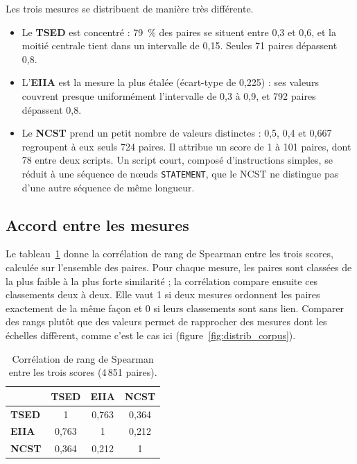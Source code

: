 \documentclass[12pt,a4paper,oneside]{report}
\begin{document}
Les trois mesures se distribuent de manière très différente.
\begin{itemize}
  \item Le \textcolor{tsedcol}{\textbf{TSED}} est concentré : 79~\% des
        paires se situent entre 0,3 et 0,6, et la moitié centrale tient dans
        un intervalle de 0,15. Seules 71 paires dépassent 0,8.
  \item L'\textcolor{eiiacol}{\textbf{EIIA}} est la mesure la plus étalée
        (écart-type de 0,225) : ses valeurs couvrent presque uniformément
        l'intervalle de 0,3 à 0,9, et 792 paires dépassent 0,8.
  \item Le \textcolor{ncstcol}{\textbf{NCST}} prend un petit nombre de valeurs
        distinctes : 0,5, 0,4 et 0,667 regroupent à eux seuls 724 paires. Il attribue un score de 1 à
        101 paires, dont 78 entre deux scripts. Un script court, composé
        d'instructions simples, se réduit à une séquence de nœuds
        \texttt{STATEMENT}, que le NCST ne distingue pas d'une autre séquence
        de même longueur.
\end{itemize}

\subsection{Accord entre les mesures}

Le tableau~\ref{tab:spearman_corpus} donne la corrélation de rang de Spearman
entre les trois scores, calculée sur l'ensemble des paires. Pour chaque
mesure, les paires sont classées de la plus faible à la plus forte
similarité ; la corrélation compare ensuite ces classements deux à deux.
Elle vaut 1 si deux mesures ordonnent les paires exactement de la même
façon et 0 si leurs classements sont sans lien. Comparer des rangs plutôt
que des valeurs permet de rapprocher des mesures dont les échelles
diffèrent, comme c'est le cas ici (figure~\ref{fig:distrib_corpus}).

\begin{table}[htbp]
\centering
\small
\renewcommand{\arraystretch}{1.15}
\begin{tabular}{lccc}
\toprule
 & \textcolor{tsedcol}{\textbf{TSED}} & \textcolor{eiiacol}{\textbf{EIIA}} &
 \textcolor{ncstcol}{\textbf{NCST}} \\
\midrule
\textcolor{tsedcol}{\textbf{TSED}} & 1 & 0,763 & 0,364 \\
\textcolor{eiiacol}{\textbf{EIIA}} & 0,763 & 1 & 0,212 \\
\textcolor{ncstcol}{\textbf{NCST}} & 0,364 & 0,212 & 1 \\
\bottomrule
\end{tabular}
\caption{Corrélation de rang de Spearman entre les trois scores
(4\,851 paires).}
\label{tab:spearman_corpus}
\end{table}
\end{document}
